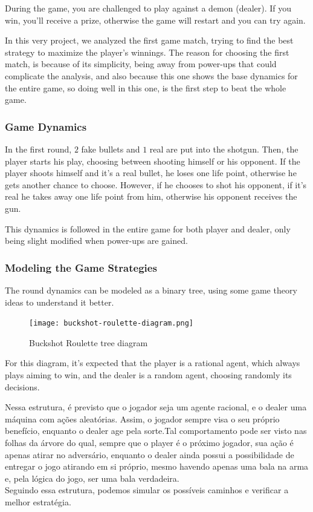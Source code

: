 \documentclass{article}
\begin{document}
During the game, you are challenged to play against a demon (dealer). If you win, you'll receive a prize, otherwise the game will restart and you can try again.

In this very project, we analyzed the first game match, trying to find the best strategy to maximize the player's winnings. The reason for choosing the first match, is because of its simplicity, being away from power-ups that could complicate the analysis, and also because this one shows the base dynamics for the entire game, so doing well in this one, is the first step to beat the whole game.

\subsubsection{Game Dynamics}

In the first round, $2$ fake bullets and $1$ real are put into the shotgun. Then, the player starts his play, choosing between shooting himself or his opponent. If the player shoots himself and it's a real bullet, he loses one life point, otherwise he gets another chance to choose. However, if he chooses to shot his opponent, if it's real he takes away one life point from him, otherwise his opponent receives the gun.

This dynamics is followed in the entire game for both player and dealer, only being slight modified when power-ups are gained.

\newpage

\subsubsection{Modeling the Game Strategies}
The round dynamics can be modeled as a binary tree, using some game theory ideas to understand it better.

\begin{figure}[h]
	\centering
	\texttt{[image: buckshot-roulette-diagram.png]}
	\caption{Buckshot Roulette tree diagram}
	\label{fig:classical-model-bckr}
\end{figure}

For this diagram, it's expected that the player is a rational agent, which always plays aiming to win, and the dealer is a random agent, choosing randomly its decisions. 

Nessa estrutura, é previsto que o jogador seja um agente racional, e o dealer uma máquina com ações aleatórias. Assim, o jogador sempre visa o seu próprio benefício, enquanto o dealer age pela sorte.Tal comportamento pode ser visto nas folhas da árvore do qual, sempre que o player é o próximo jogador, sua ação é apenas atirar no adversário, enquanto o dealer ainda possui a possibilidade de entregar o jogo atirando em si próprio, mesmo havendo apenas uma bala na arma e, pela lógica do jogo, ser uma bala verdadeira.\\
Seguindo essa estrutura, podemos simular os possíveis caminhos e verificar a melhor estratégia.
\end{document}
